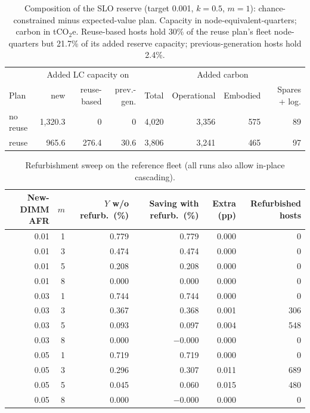 \documentclass{article} %
\begin{document}
\begin{table}[h]
\caption{Composition of the SLO reserve (target 0.001, $k=0.5$, $m=1$): chance-constrained minus expected-value plan. Capacity in node-equivalent-quarters; carbon in tCO$_2$e. Reuse-based hosts hold 30\% of the reuse plan's fleet node-quarters but 21.7\% of its added reserve capacity; previous-generation hosts hold 2.4\%.}
\label{tab:composition}
\begin{center}
\small
\begin{tabular}{lrrrrrrr}
\toprule
 & \multicolumn{3}{c}{Added LC capacity on} & \multicolumn{4}{c}{Added carbon} \\
Plan & new & reuse-based & prev.-gen. & Total & Operational & Embodied & Spares + log. \\
\midrule
no reuse & 1,320.3 & 0 & 0 & 4,020 & 3,356 & 575 & 89 \\
reuse & 965.6 & 276.4 & 30.6 & 3,806 & 3,241 & 465 & 97 \\
\bottomrule
\end{tabular}
\end{center}
\end{table}

\begin{table}[h]
\caption{Refurbishment sweep on the reference fleet (all runs also allow in-place cascading).}
\label{tab:refurb}
\begin{center}
\small
\begin{tabular}{rrrrrr}
\toprule
New-DIMM AFR & $m$ & $Y$ w/o refurb.\ (\%) & Saving with refurb.\ (\%) & Extra (pp) & Refurbished hosts \\
\midrule
0.01 & 1 & 0.779 & 0.779 & 0.000 & 0 \\
0.01 & 3 & 0.474 & 0.474 & 0.000 & 0 \\
0.01 & 5 & 0.208 & 0.208 & 0.000 & 0 \\
0.01 & 8 & 0.000 & 0.000 & 0.000 & 0 \\
0.03 & 1 & 0.744 & 0.744 & 0.000 & 0 \\
0.03 & 3 & 0.367 & 0.368 & 0.001 & 306 \\
0.03 & 5 & 0.093 & 0.097 & 0.004 & 548 \\
0.03 & 8 & 0.000 & $-0.000$ & 0.000 & 0 \\
0.05 & 1 & 0.719 & 0.719 & 0.000 & 0 \\
0.05 & 3 & 0.296 & 0.307 & 0.011 & 689 \\
0.05 & 5 & 0.045 & 0.060 & 0.015 & 480 \\
0.05 & 8 & 0.000 & $-0.000$ & 0.000 & 0 \\
\bottomrule
\end{tabular}
\end{center}
\end{table}
\end{document}
